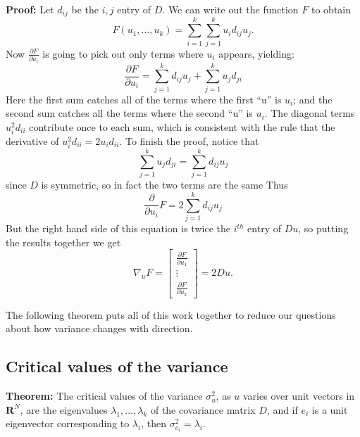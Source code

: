 \documentclass[
  oneside]{scrbook}
\newcommand{\df}[1]{\frac{\partial}{\partial #1}}
\begin{document}
\textbf{Proof:} Let \(d_{ij}\) be the \(i,j\) entry of \(D\). We can
write out the function \(F\) to obtain \[
F(u_1,\ldots, u_{k}) = \sum_{i=1}^{k} \sum_{j=1}^{k} u_i d_{ij} u_j.
\] Now \(\frac{\partial F}{\partial u_{i}}\) is going to pick out only
terms where \(u_{i}\) appears, yielding: \[
\frac{\partial F}{\partial u_{i}} = \sum_{j=1}^{k} d_{ij}u_{j} + \sum_{j=1}^{k} u_{j}d_{ji}
\] Here the first sum catches all of the terms where the first ``u'' is
\(u_{i}\); and the second sum catches all the terms where the second
``u'' is \(u_{i}\). The diagonal terms \(u_{i}^2d_{ii}\) contribute once
to each sum, which is consistent with the rule that the derivative of
\(u_{i}^2d_{ii} = 2u_{i}d_{ii}\). To finish the proof, notice that \[
\sum_{j=1}^{k} u_{j}d_{ji} = \sum_{j=1}^{k} d_{ij}u_{j} 
\] since \(D\) is symmetric, so in fact the two terms are the same Thus
\[
\df{u_{i}}F = 2\sum_{j=1}^{k} d_{ij}u_{j}
\] But the right hand side of this equation is twice the \(i^{th}\)
entry of \(Du\), so putting the results together we get \[
\nabla_{u}F = \left[\begin{matrix} \frac{\partial F}{\partial u_{1}} \\ \vdots \\ \frac{\partial F}{\partial u_{k}}\end{matrix}\right] = 2Du.
\]

The following theorem puts all of this work together to reduce our
questions about how variance changes with direction.

\hypertarget{sec:critvals}{%
\subsection{Critical values of the variance}\label{sec:critvals}}

\textbf{Theorem:} The critical values of the variance \(\sigma_{u}^2\),
as \(u\) varies over unit vectors in \(\mathbf{R}^{N}\), are the
eigenvalues \(\lambda_{1},\ldots,\lambda_{k}\) of the covariance matrix
\(D\), and if \(e_{i}\) is a unit eigenvector corresponding to
\(\lambda_{i}\), then \(\sigma_{e_{i}}^2 = \lambda_{i}\).
\end{document}
